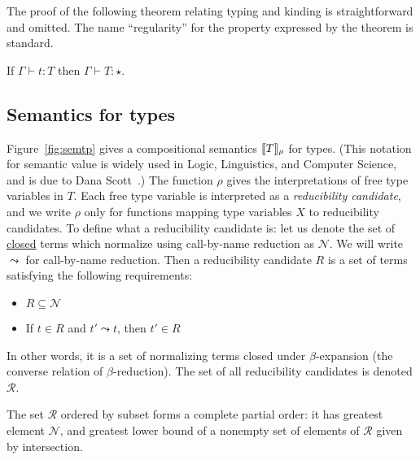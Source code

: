 \documentclass{article}
\begin{document}
The proof of the following theorem relating typing and kinding is straightforward and omitted.
The name ``regularity'' for the property expressed by the theorem is standard.
\vspace{.25cm}
\begin{theorem}[Regularity]
\label{thm:regularity}
If $\Gamma \vdash t : T$ then $\Gamma \vdash T:\star$.
\end{theorem}


\subsection{Semantics for types}
\label{sec:sem}

Figure~\ref{fig:semtp} gives a compositional semantics
$\llbracket T \rrbracket_\rho$ for types.  (This notation for semantic
value is widely used in Logic, Linguistics, and Computer Science,
and is due to Dana Scott~\citep{rabern2016}.) The function $\rho$ gives the
interpretations of free type variables in $T$.  Each free type
variable is interpreted as a \emph{reducibility candidate}, and we write
$\rho$ only for functions mapping type variables $X$ to reducibility
candidates.  To define what a reducibility candidate is: let us denote
the set of \underline{closed} terms which normalize using call-by-name
reduction as $\mathcal{N}$.  We will write $\leadsto$ for call-by-name
reduction. Then a reducibility candidate $R$ is a set of terms
satisfying the following requirements:
\begin{itemize}
\item $R \subseteq \mathcal{N}$
\item If $t\in R$ and $t'\leadsto t$, then $t'\in R$
\end{itemize}
In other words, it is a set of normalizing terms closed under $\beta$-expansion (the converse relation
of $\beta$-reduction).  The set of all reducibility candidates is denoted $\mathcal{R}$.

\vspace{0.25cm}

\begin{lemma}
  The set $\mathcal{R}$ ordered by subset forms a complete partial
  order: it has greatest element $\mathcal{N}$, and greatest lower bound
  of a nonempty set of elements of $\mathcal{R}$ given by
  intersection.
\end{lemma}

\vspace{0.25cm}
\end{document}
